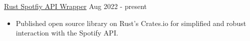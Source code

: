 \documentclass[9pt]{resume}
\begin{document}
\begin{experiencelist}
{\begin{itemize}[noitemsep, topsep=1pt]
            \end{itemize}}
        \experiencenocompany
            {\href{https://github.com/TheSharkhead2/spotify.rs}{Rust Spotfiy API Wrapper}}
            {Aug 2022 - present}
            {\begin{itemize}[noitemsep, topsep=1pt]
                \item Published open source library on Rust's Crates.io for simplified and robust interaction with the Spotify API.
            \end{itemize}}
    \end{experiencelist}
\end{document}
